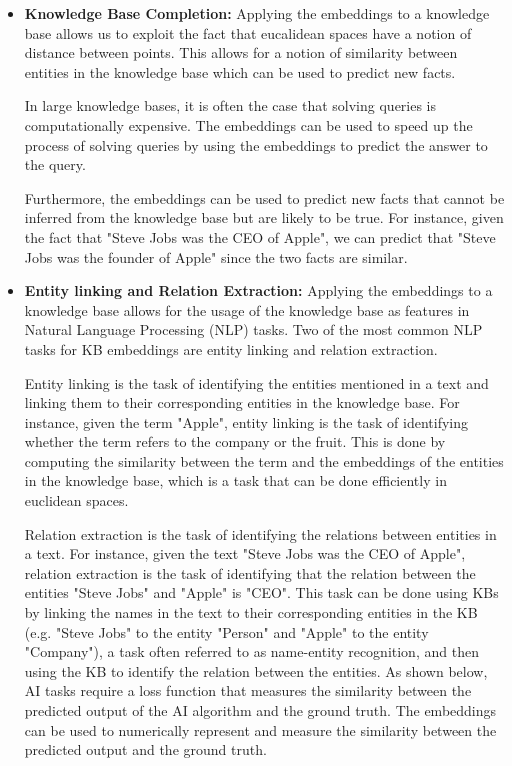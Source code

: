 \begin{itemize}
    \item \textbf{Knowledge Base Completion:}\label{item:kb_completion}
    Applying the embeddings to a knowledge base allows us to
    exploit the fact that eucalidean spaces have a notion of distance between points.
    This allows for a notion of similarity between entities in the knowledge base
    which can be used to predict new facts.
    \par In large knowledge bases, it is often the case that solving queries is computationally expensive.
    The embeddings can be used to speed up the process of solving queries by using the embeddings to
    predict the answer to the query.
    \par Furthermore, the embeddings can be used to predict new facts that cannot be inferred from the knowledge base
    but are likely to be true.
    For instance, given the fact that "Steve Jobs was the CEO of Apple", we can predict that "Steve Jobs was the founder of Apple"
    since the two facts are similar.
    \item \textbf{Entity linking and Relation Extraction:} Applying the embeddings to a knowledge base allows for
    the usage of the knowledge base as features in Natural Language Processing (NLP) tasks.
    Two of the most common NLP tasks for KB embeddings are entity linking and relation extraction.
    \par Entity linking is the task of identifying the entities mentioned in a text and linking them to their corresponding
    entities in the knowledge base.
    For instance, given the term "Apple", entity linking is the task of identifying whether the term refers to the company or the fruit.
    This is done by computing the similarity between the term and the embeddings of the entities in the knowledge base,
    which is a task that can be done efficiently in euclidean spaces.
    \par Relation extraction is the task of identifying the relations between entities in a text.
    For instance, given the text "Steve Jobs was the CEO of Apple", relation extraction is the task of identifying that
    the relation between the entities "Steve Jobs" and "Apple" is "CEO".
    This task can be done using KBs by linking the names in the text to their corresponding entities in the KB (e.g. "Steve Jobs" to the entity "Person"
    and "Apple" to the entity "Company"), a task often referred to as name-entity recognition, and then using the KB to identify the relation between the entities.
    As shown below, AI tasks require a loss function that measures the similarity between 
    the predicted output of the AI algorithm and the ground truth.
    The embeddings can be used to numerically represent and measure the similarity between the predicted output and the ground truth.    
\end{itemize}

